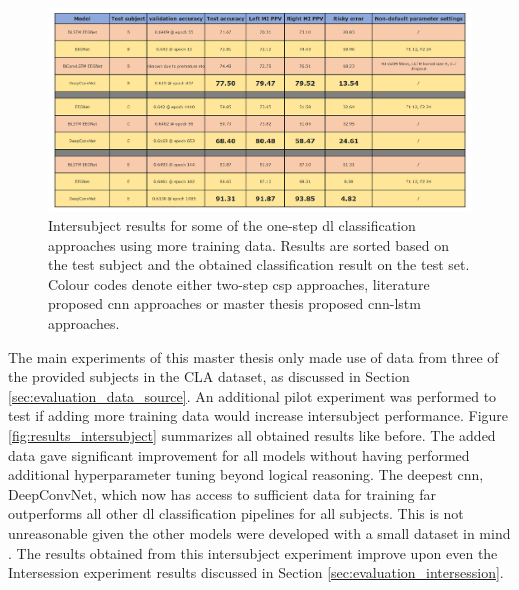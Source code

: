 \begin{figure}[ht]
    \centering
    \includegraphics[width=\linewidth]{../images/results/more_data.pdf}
    \captionsetup{width=\linewidth}
    \captionsetup{justification=centering}
    \caption{Intersubject results for some of the one-step \gls{dl} classification approaches using more training data. Results are sorted based on the test subject and the obtained classification result on the test set. Colour codes denote either two-step \gls{csp} approaches, literature proposed \gls{cnn} approaches or master thesis proposed \gls{cnn}-\gls{lstm} approaches.} 
    \label{fig:results_more_data}
\end{figure}

The main experiments of this master thesis only made use of data from three of the provided subjects in the CLA dataset, as discussed in Section \ref{sec:evaluation_data_source}.
An additional pilot experiment was performed to test if adding more training data would increase intersubject performance.
Figure \ref{fig:results_intersubject} summarizes all obtained results like before.
The added data gave significant improvement for all models without having performed additional hyperparameter tuning beyond logical reasoning.
The deepest \gls{cnn}, DeepConvNet, which now has access to sufficient data for training far outperforms all other \gls{dl} classification pipelines for all subjects.
This is not unreasonable given the other models were developed with a small dataset in mind \citep{eeg_model_eegnet}.
The results obtained from this intersubject experiment improve upon even the Intersession experiment results discussed in Section \ref{sec:evaluation_intersession}.

